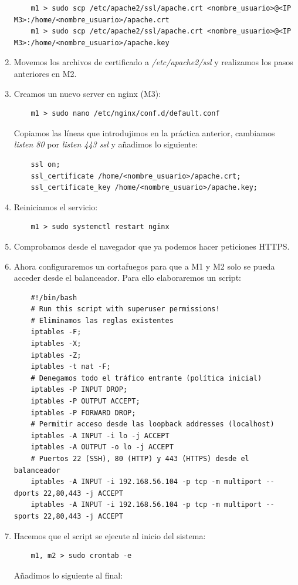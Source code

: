 \documentclass[12pt,spanish]{article}
\begin{document}
\begin{enumerate}
\begin{lstlisting}
	m1 > sudo scp /etc/apache2/ssl/apache.crt <nombre_usuario>@<IP M3>:/home/<nombre_usuario>/apache.crt
	m1 > sudo scp /etc/apache2/ssl/apache.crt <nombre_usuario>@<IP M3>:/home/<nombre_usuario>/apache.key
	\end{lstlisting}
	\item Movemos los archivos de certificado a \emph{/etc/apache2/ssl} y realizamos los pasos anteriores en M2.
	\item Creamos un nuevo server en nginx (M3):
	\begin{lstlisting}
	m1 > sudo nano /etc/nginx/conf.d/default.conf
	\end{lstlisting}
	Copiamos las líneas que introdujimos en la práctica anterior, cambiamos \emph{listen 80} por \emph{listen 443 ssl} y añadimos lo siguiente:
	\begin{lstlisting}
	ssl on;
	ssl_certificate /home/<nombre_usuario>/apache.crt;
	ssl_certificate_key /home/<nombre_usuario>/apache.key;
	\end{lstlisting}
	\item Reiniciamos el servicio:
	\begin{lstlisting}
	m1 > sudo systemctl restart nginx
	\end{lstlisting}
	\item Comprobamos desde el navegador que ya podemos hacer peticiones HTTPS.
	\item Ahora configuraremos un cortafuegos para que a M1 y M2 solo se pueda acceder desde el balanceador. Para ello elaboraremos un script:
	\begin{lstlisting}
	#!/bin/bash
	# Run this script with superuser permissions!
	# Eliminamos las reglas existentes
	iptables -F;
	iptables -X;
	iptables -Z;
	iptables -t nat -F;
	# Denegamos todo el tráfico entrante (política inicial)
	iptables -P INPUT DROP;
	iptables -P OUTPUT ACCEPT;
	iptables -P FORWARD DROP;
	# Permitir acceso desde las loopback addresses (localhost)
	iptables -A INPUT -i lo -j ACCEPT
	iptables -A OUTPUT -o lo -j ACCEPT
	# Puertos 22 (SSH), 80 (HTTP) y 443 (HTTPS) desde el balanceador
	iptables -A INPUT -i 192.168.56.104 -p tcp -m multiport --dports 22,80,443 -j ACCEPT
	iptables -A INPUT -i 192.168.56.104 -p tcp -m multiport --sports 22,80,443 -j ACCEPT
	\end{lstlisting}
	\item Hacemos que el script se ejecute al inicio del sistema:
	\begin{lstlisting}
	m1, m2 > sudo crontab -e
	\end{lstlisting}
	Añadimos lo siguiente al final:

\end{enumerate}
\end{document}

